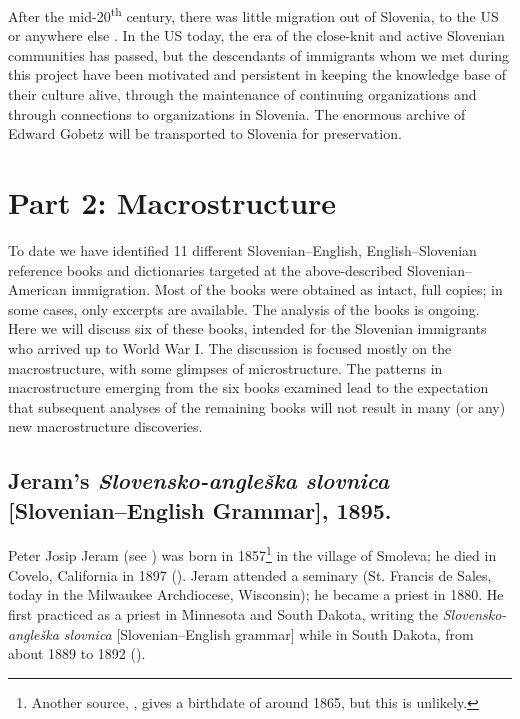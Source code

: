 \documentclass[output=paper,colorlinks,citecolor=brown,arabicfont,chinesefont]{langscibook}
\begin{document}
After the mid-20\textsuperscript{th} century, there was little migration out of Slovenia, to the US or anywhere else \citep{Barkeretal2023}. In the US today, the era of the close-knit and active Slovenian communities has passed, but the descendants of immigrants whom we met during this project have been motivated and persistent in keeping the knowledge base of their culture alive, through the maintenance of continuing organizations and through connections to organizations in Slovenia. The enormous archive of Edward Gobetz will be transported to Slovenia for preservation.

\section{Part 2: Macrostructure}

To date we have identified 11 different Slovenian–English, English–Slovenian reference books and dictionaries targeted at the above-described Slovenian–American immigration. Most of the books were obtained as intact, full copies; in some cases, only excerpts are available. The analysis of the books is ongoing. Here we will discuss six of these books, intended for the Slovenian immigrants who arrived up to World War I. The discussion is focused mostly on the macrostructure, with some glimpses of microstructure. The patterns in macrostructure emerging from the six books examined lead to the expectation that subsequent analyses of the remaining books will not result in many (or any) new macrostructure discoveries.

\subsection{Jeram’s \emph{Slovensko-angleška slovnica} [Slovenian–English Grammar], 1895.}

Peter Josip Jeram (see ) was born in 1857\footnote{Another source, \citet{Grafenauer2013}, gives a birthdate of around 1865, but this is unlikely.} in the village of Smoleva; he died in Covelo, California in 1897 (\citealt{Cesar-nedzbala1990, Sedmak2021a}). Jeram attended a seminary (St. Francis de Sales, today in the Milwaukee Archdiocese, Wisconsin); he became a priest in 1880. He first practiced as a priest in Minnesota and South Dakota, writing the \emph{Slovensko-angleška slovnica} [Slovenian–English grammar] while in South Dakota, from about 1889 to 1892 (\citealt{Cesar-nedzbala1990, Sedmak2021a, Sedmak2021b, Sedmak2021c}).
\end{document}

